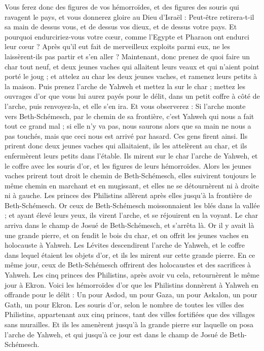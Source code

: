 \begin{multicols}{2}
Vous ferez donc des figures de vos hémorroïdes, et des figures des souris qui ravagent le pays, et vous donnerez gloire au Dieu d'Israël : Peut-être retirera-t-il sa main de dessus vous, et de dessus vos dieux, et de dessus votre pays.
Et pourquoi endurciriez-vous votre cœur, comme l'Egypte et Pharaon ont endurci leur cœur ? Après qu'il eut fait de merveilleux exploits parmi eux, ne les laissèrent-ils pas partir et s'en aller ?
Maintenant, donc prenez de quoi faire un char tout neuf, et deux jeunes vaches qui allaitent leurs veaux et qui n'aient point porté le joug ; et attelez au char les deux jeunes vaches, et ramenez leurs petits à la maison.
Puis prenez l'arche de Yahweh et mettez la sur le char ; mettez les ouvrages d'or que vous lui aurez payés pour le délit, dans un petit coffre à côté de l'arche, puis renvoyez-la, et elle s'en ira.
Et vous observerez : Si l'arche monte vers Beth-Schémesch, par le chemin de sa frontière, c'est Yahweh qui nous a fait tout ce grand mal ; si elle n'y va pas, nous saurons alors que sa main ne nous a pas touchés, mais que ceci nous est arrivé par hasard.
Ces gens firent ainsi. Ils prirent donc deux jeunes vaches qui allaitaient, ils les attelèrent au char, et ils enfermèrent leurs petits dans l'étable.
Ils mirent sur le char l'arche de Yahweh, et le coffre avec les souris d'or, et les figures de leurs hémorroïdes.
Alors les jeunes vaches prirent tout droit le chemin de Beth-Schémesch, elles suivirent toujours le même chemin en marchant et en mugissant, et elles ne se détournèrent ni à droite ni à gauche. Les princes des Philistins allèrent après elles jusqu'à la frontière de Beth-Schémesch.
Or ceux de Beth-Schémesch moissonnaient les blés dans la vallée ; et ayant élevé leurs yeux, ils virent l'arche, et se réjouirent en la voyant.
Le char arriva dans le champ de Josué de Beth-Schémesch, et s'arrêta là. Or il y avait là une grande pierre, et on fendit le bois du char, et on offrit les jeunes vaches en holocauste à Yahweh.
Les Lévites descendirent l'arche de Yahweh, et le coffre dans lequel étaient les objets d'or, et ils les mirent sur cette grande pierre. En ce même jour, ceux de Beth-Schémesch offrirent des holocaustes et des sacrifices à Yahweh.
Les cinq princes des Philistins, après avoir vu cela, retournèrent le même jour à Ekron.
Voici les hémorroïdes d'or que les Philistins donnèrent à Yahweh en offrande pour le délit : Un pour Asdod, un pour Gaza, un pour Askalon, un pour Gath, un pour Ekron.
Les souris d'or, selon le nombre de toutes les villes des Philistins, appartenant aux cinq princes, tant des villes fortifiées que des villages sans murailles. Et ils les amenèrent jusqu'à la grande pierre sur laquelle on posa l'arche de Yahweh, et qui jusqu'à ce jour est dans le champ de Josué de Beth-Schémesch.

\end{multicols}
